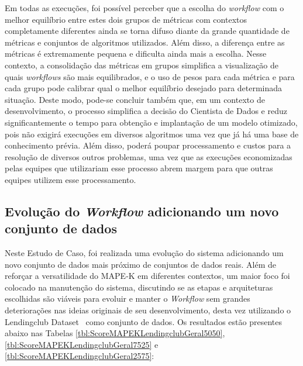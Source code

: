 \documentclass[twocolumn]{article}
\begin{document}
Em todas as execuções, foi possível perceber que a escolha do \textit{workflow} com o melhor equilíbrio entre estes dois grupos de métricas com contextos completamente diferentes ainda se torna difuso diante da grande quantidade de métricas e conjuntos de algoritmos utilizados. Além disso, a diferença entre as métricas é extremamente pequena e dificulta ainda mais a escolha. Nesse contexto, a consolidação das métricas em grupos simplifica a visualização de quais \textit{workflows} são mais equilibrados, e o uso de pesos para cada métrica e para cada grupo pode calibrar qual o melhor equilíbrio desejado para determinada situação. Deste modo, pode-se concluir também que, em um contexto de desenvolvimento, o processo simplifica a decisão do Cientista de Dados e reduz significantemente o tempo para obtenção e implantação de um modelo otimizado, pois não exigirá execuções em diversos algoritmos uma vez que já há uma base de conhecimento prévia. Além disso, poderá poupar processamento e custos para a resolução de diversos outros problemas, uma vez que as execuções economizadas pelas equipes que utilizariam esse processo abrem margem para que outras equipes utilizem esse processamento.

\subsection{Evolução do \textit{Workflow} adicionando um novo conjunto de dados}

Neste Estudo de Caso, foi realizada uma evolução do sistema adicionando um novo conjunto de dados mais próximo de conjuntos de dados reais. Além de reforçar a versatilidade do MAPE-K em diferentes contextos, um maior foco foi colocado na manutenção do sistema, discutindo se as etapas e arquiteturas escolhidas são viáveis para evoluir e manter o \textit{Workflow} sem grandes deteriorações nas ideias originais de seu desenvolvimento, desta vez utilizando o Lendingclub Dataset~\citep{lendingclub_2022} como conjunto de dados. Os resultados estão presentes abaixo nas Tabelas \ref{tbl:ScoreMAPEKLendingclubGeral5050}, \ref{tbl:ScoreMAPEKLendingclubGeral7525} e \ref{tbl:ScoreMAPEKLendingclubGeral2575}:
\end{document}
